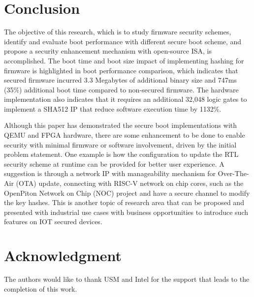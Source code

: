\documentclass[review]{elsarticle}
\begin{document}
\section{ Conclusion}
The objective of this research, which is to study firmware security schemes, identify and evaluate boot performance with different secure boot scheme, and propose a security enhancement mechanism with open-source ISA, is accomplished. The boot time and boot size impact of implementing hashing for firmware is highlighted in boot performance comparison, which indicates that secured firmware incurred 3.3 Megabytes of additional binary size and 747ms (35\%) additional boot time compared to non-secured firmware. The hardware implementation also indicates that it requires an additional 32,048 logic gates to implement a SHA512 IP that reduce software execution time by 1132\%.

Although this paper has demonstrated the secure boot implementations with QEMU and FPGA hardware, there are some enhancement to be done to enable security with minimal firmware or software involvement, driven by the initial problem statement. One example is how the configuration to update the RTL security scheme at runtime can be provided for better user experience. A suggestion is through a network IP with manageability mechanism for Over-The-Air (OTA) update, connecting with RISC-V network on chip cores, such as the OpenPiton Network on Chip (NOC) project and have a secure channel to modify the key hashes. This is another topic of research area that can be proposed and presented with industrial use cases with business opportunities to introduce such features on IOT secured devices.

\section*{Acknowledgment}
The authors would like to thank USM and Intel for the support that leads to the completion of this work.


\end{document}
